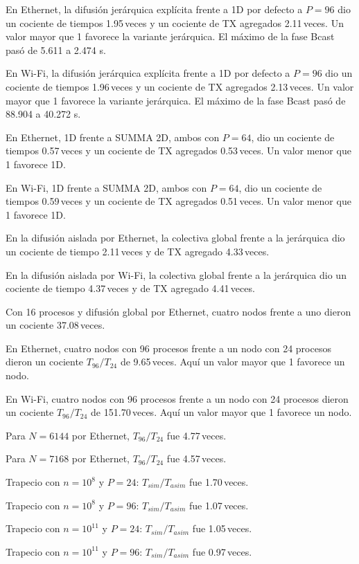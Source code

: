 En Ethernet, la difusión jerárquica explícita frente a 1D por defecto a $P=96$ dio un cociente de tiempos 1.95\,veces y un cociente de TX agregados 2.11\,veces. Un valor mayor que 1 favorece la variante jerárquica. El máximo de la fase Bcast pasó de 5.611 a 2.474 s.


En Wi-Fi, la difusión jerárquica explícita frente a 1D por defecto a $P=96$ dio un cociente de tiempos 1.96\,veces y un cociente de TX agregados 2.13\,veces. Un valor mayor que 1 favorece la variante jerárquica. El máximo de la fase Bcast pasó de 88.904 a 40.272 s.


En Ethernet, 1D frente a SUMMA 2D, ambos con $P=64$, dio un cociente de tiempos 0.57\,veces y un cociente de TX agregados 0.53\,veces. Un valor menor que 1 favorece 1D.


En Wi-Fi, 1D frente a SUMMA 2D, ambos con $P=64$, dio un cociente de tiempos 0.59\,veces y un cociente de TX agregados 0.51\,veces. Un valor menor que 1 favorece 1D.


En la difusión aislada por Ethernet, la colectiva global frente a la jerárquica dio un cociente de tiempo 2.11\,veces y de TX agregado 4.33\,veces.


En la difusión aislada por Wi-Fi, la colectiva global frente a la jerárquica dio un cociente de tiempo 4.37\,veces y de TX agregado 4.41\,veces.


Con 16 procesos y difusión global por Ethernet, cuatro nodos frente a uno dieron un cociente 37.08\,veces.


En Ethernet, cuatro nodos con 96 procesos frente a un nodo con 24 procesos dieron un cociente $T_{96}/T_{24}$ de 9.65\,veces. Aquí un valor mayor que 1 favorece un nodo.


En Wi-Fi, cuatro nodos con 96 procesos frente a un nodo con 24 procesos dieron un cociente $T_{96}/T_{24}$ de 151.70\,veces. Aquí un valor mayor que 1 favorece un nodo.


Para $N=6144$ por Ethernet, $T_{96}/T_{24}$ fue 4.77\,veces.


Para $N=7168$ por Ethernet, $T_{96}/T_{24}$ fue 4.57\,veces.


Trapecio con $n=10^8$ y $P=24$: $T_{sim}/T_{asim}$ fue 1.70\,veces.


Trapecio con $n=10^8$ y $P=96$: $T_{sim}/T_{asim}$ fue 1.07\,veces.


Trapecio con $n=10^{11}$ y $P=24$: $T_{sim}/T_{asim}$ fue 1.05\,veces.


Trapecio con $n=10^{11}$ y $P=96$: $T_{sim}/T_{asim}$ fue 0.97\,veces.

